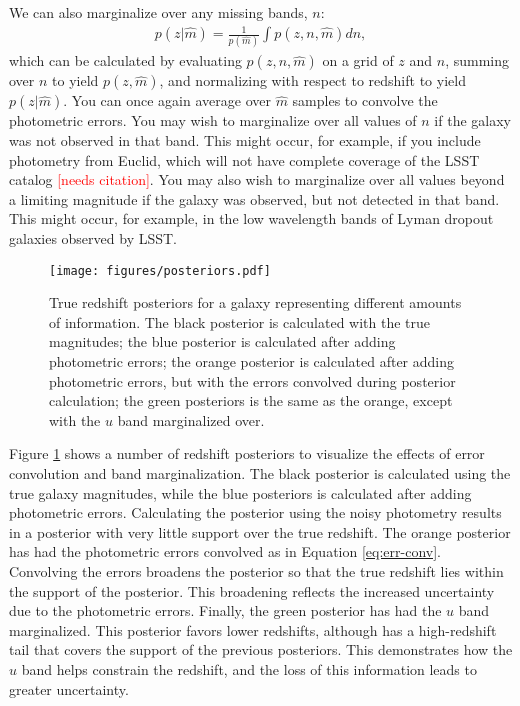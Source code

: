 \documentclass[twocolumn]{aastex631}
\newcommand{\note}[1]{\textsf{\textcolor{red}{#1}}}
\newcommand{\needscite}{\note{[needs citation]}}
\begin{document}
We can also marginalize over any missing bands, $n$:
\begin{align}
    p(z|\hat{m}) = \frac{1}{p(\hat{m})} \int p(z, n, \hat{m}) dn,
\end{align}
which can be calculated by evaluating $p(z, n, \hat{m})$ on a grid of $z$ and $n$, summing over $n$ to yield $p(z, \hat{m})$, and normalizing with respect to redshift to yield $p(z|\hat{m})$.
You can once again average over $\hat{m}$ samples to convolve the photometric errors.
You may wish to marginalize over all values of $n$ if the galaxy was not observed in that band.
This might occur, for example, if you include photometry from Euclid, which will not have complete coverage of the LSST catalog \needscite.
You may also wish to marginalize over all values beyond a limiting magnitude if the galaxy was observed, but not detected in that band.
This might occur, for example, in the low wavelength bands of Lyman dropout galaxies observed by LSST.

\begin{figure}[t!]
    \begin{centering}
        \texttt{[image: figures/posteriors.pdf]}
        \caption{
            True redshift posteriors for a galaxy representing different amounts of information.
            The black posterior is calculated with the true magnitudes;
            the blue posterior is calculated after adding photometric errors;
            the orange posterior is calculated after adding photometric errors, but with the errors convolved during posterior calculation;
            the green posteriors is the same as the orange, except with the $u$ band marginalized over.
        }
        \label{fig:posteriors}
    \end{centering}
\end{figure}

Figure \ref{fig:posteriors} shows a number of redshift posteriors to visualize the effects of error convolution and band marginalization.
The black posterior is calculated using the true galaxy magnitudes, while the blue posteriors is calculated after adding photometric errors.
Calculating the posterior using the noisy photometry results in a posterior with very little support over the true redshift.
The orange posterior has had the photometric errors convolved as in Equation \ref{eq:err-conv}.
Convolving the errors broadens the posterior so that the true redshift lies within the support of the posterior.
This broadening reflects the increased uncertainty due to the photometric errors.
Finally, the green posterior has had the $u$ band marginalized.
This posterior favors lower redshifts, although has a high-redshift tail that covers the support of the previous posteriors. 
This demonstrates how the $u$ band helps constrain the redshift, and the loss of this information leads to greater uncertainty.
\end{document}
